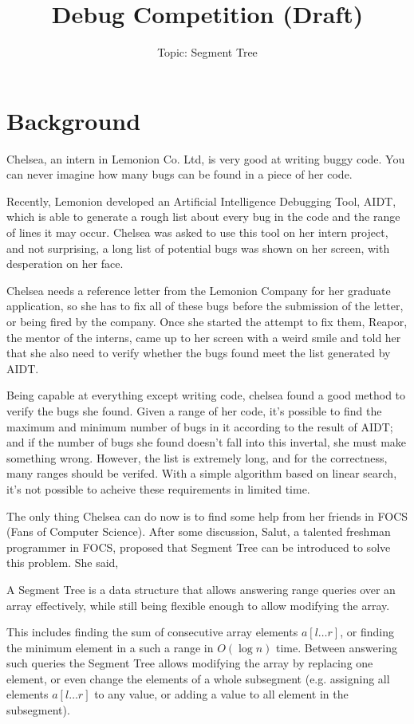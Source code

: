 \documentclass[11pt,a4paper]{article}
\title{Debug Competition (Draft)}
\subtitle{Topic: Segment Tree}
\begin{document}
\maketitle

\section{Background}

Chelsea, an intern in Lemonion Co. Ltd, is very good at writing buggy code. You can never imagine how many bugs can be found in a piece of her code. \medskip

Recently, Lemonion developed an Artificial Intelligence Debugging Tool, AIDT, which is able to generate a rough list about every bug in the code and the range of lines it may occur. Chelsea was asked to use this tool on her intern project, and not surprising, a long list of potential bugs was shown on her screen, with desperation on her face. \medskip

Chelsea needs a reference letter from the Lemonion Company for her graduate application, so she has to fix all of these bugs before the submission of the letter, or being fired by the company. Once she started the attempt to fix them, Reapor, the mentor of the interns, came up to her screen with a weird smile and told her that she also need to verify whether the bugs found meet the list generated by AIDT. \medskip

Being capable at everything except writing code, chelsea found a good method to verify the bugs she found. Given a range of her code, it's possible to find the maximum and minimum number of bugs in it according to the result of AIDT; and if the number of bugs she found doesn't fall into this invertal, she must make something wrong. However, the list is extremely long, and for the correctness, many ranges should be verifed. With a simple algorithm based on linear search, it's not possible to acheive these requirements in limited time. \medskip

The only thing Chelsea can do now is to find some help from her friends in FOCS (Fans of Computer Science). After some discussion, Salut, a talented freshman programmer in FOCS, proposed that Segment Tree can be introduced to solve this problem. She said, \medskip

\begin{tcolorbox}[colback=blue!5!white,colframe=blue!75!black,title=Segment Tree]
  A Segment Tree\cite{segmenttree} is a data structure that allows answering range queries over an array effectively, while still being flexible enough to allow modifying the array. \medskip

  This includes finding the sum of consecutive array elements $a[l\dots r]$, or finding the minimum element in a such a range in $O(\log n)$ time. Between answering such queries the Segment Tree allows modifying the array by replacing one element, or even change the elements of a whole subsegment (e.g. assigning all elements $a[l\dots r]$ to any value, or adding a value to all element in the subsegment).
\end{tcolorbox}
\end{document}
